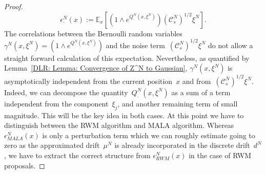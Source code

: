 \begin{proof}
 \begin{equation}
   \epsilon_{\cdot}^N (x) := \mathbb{E}_x[ (1 \wedge e^{Q^N_{\cdot}(x, \xi^N)}) (\mathcal{C}_s^N)^{1/2} \xi^N].
 \end{equation}
 The correlations between the Bernoulli random variables~$\gamma^N(x, \xi^N)=(1 \wedge e^{Q^N_{\cdot}(x, \xi^N)})$ and the noise term~$ (\mathcal{C}_s^N)^{1/2} \xi^N$ do not allow a straight forward calculation of this expectation. Nevertheless, as quantified by Lemma~\ref{DLR: Lemma: Convergence of Z^N to Gaussian}, $\gamma^N(x, \xi^N)$ is asymptotically independent from the current position~$x$ and from~$ (\mathcal{C}_s^N)^{1/2} \xi^N$. Indeed, we can decompose the quantity~$Q^N_{\cdot}(x, \xi^N)$ as a sum of a term independent from the component~$\xi_j$, and another remaining term of small magnitude. This will be the key idea in both cases. At this point we have to distinguish between the RWM algorithm and MALA algorithm. Whereas $\epsilon_{MALA}^N (x)$ is only a perturbation term which we can roughly estimate going to zero as the approximated drift~$\mu^N$ is already incorporated in the discrete drift~$d^N$, we have to extract the correct structure from $\epsilon_{RWM}^N (x)$ in the case of RWM proposals.
 \newline
 

\end{proof}
